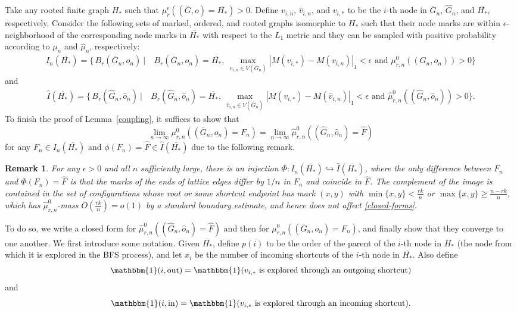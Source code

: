 \documentclass[10pt]{amsart}
\newtheorem{remark}[theorem]{Remark}
\begin{document}
Take any rooted finite graph $H_*$ such that
\(
\mu_r^\epsilon((\overline{G},o)=\overline{H_*})>0.
\)
Define $v_{i,n}$, $\hat v_{i,n}$, and $v_{i,*}$ to be the $i$-th node in
$\overline{G}_n$, $\hat G_n$, and $\overline{H_*}$, respectively. Consider the
following sets of marked, ordered, and rooted graphs isomorphic to $H_*$ such
that their node marks are within $\epsilon$-neighborhood of the corresponding
node marks in $\overline{H_*}$ with respect to the $L_1$ metric and they can be
sampled with positive probability according to $\mu_n$ and $\hat\mu_n$,
respectively:
\begin{align*}
I_n(\overline{H_*})=\Big\{\,B_r(\overline{G}_n,o_n)\ \Big|\ &
B_r(\overline{G}_n,o_n)=\overline{H_*},\
\max_{v_{i,n}\in V(\overline{G}_n)}
|M(v_{i,*})-M(v_{i,n})|_1<\epsilon \text{ and }
\mu_{r,n}^0((G_n,o_n))>0
\Big\}
\end{align*}
and
\begin{align*}
\hat I(\overline{H_*})=\Big\{\,B_r(\hat G_n,\hat o_n)\ \Big|\ &
B_r(\hat G_n,\hat o_n)=\overline{H_*},\
\max_{\hat v_{i,n}\in V(\hat G_n)}
|M(v_{i,*})-M(\hat v_{i,n})|_1<\epsilon \text{ and } \hat\mu_{r,n}^0((\hat G_n,\hat o_n))>0
\Big\}.
\end{align*}
To finish the proof of Lemma~\ref{coupling}, it suffices to show that
\begin{equation}\label{closed-forms}
\lim_{n\to\infty}\mu_{r,n}^0((\overline{G}_n,o_n)=F_n)
=
\lim_{n\to\infty}\hat\mu_{r,n}^0((\hat G_n,\hat o_n)=\hat F)
\end{equation}
for any $F_n\in I_n(\overline{H_*})$ and $\phi(F_n)=\hat F\in\hat I(\overline{H_*})$ due to the following remark.
\begin{remark}\label{dif-lattice-con}
For any $\epsilon>0$ and all $n$ sufficiently large, there is an injection $\Phi: I_n(\overline{H_*}) \hookrightarrow \hat I(\overline{H_*})$, where the only difference between $F_n$ and $\Phi(F_n)=\hat F$ is that the marks of the ends of lattice edges differ by $1/n$ in $F_n$ and coincide in $\hat F$. The complement of the image is contained in the set of configurations whose root or some shortcut endpoint has mark $(x,y)$ with $\min\{x,y\}<\frac{rk}{n}$ or $\max\{x,y\}\ge\frac{n-rk}{n}$, which has $\hat\mu_{r,n}^0$-mass $O\left(\frac{rk}{n}\right)=o(1)$ by a standard boundary estimate, and hence does not affect \eqref{closed-forms}.
\end{remark}
To do so, we write a closed form for
$\hat\mu_{r,n}^0((\hat G_n,\hat o_n)=\hat F)$ and then for
$\mu_{r,n}^0((\overline{G}_n,o_n)=F_n)$, and finally show that they converge to
one another.
We first introduce some notation. Given $\overline{H_*}$, define $p(i)$ to be the order of the parent of the $i$-th node in $H_*$ (the node from which it is explored in the BFS process), and let $x_i$ be the number of incoming shortcuts of the $i$-th node in $\overline{H_*}$. Also define
\[
\mathbbm{1}(i,\mathrm{out})
=
\mathbbm{1}(v_{i,*}\text{ is explored through an outgoing shortcut})
\]
and
\[
\mathbbm{1}(i,\mathrm{in})
=
\mathbbm{1}(v_{i,*}\text{ is explored through an incoming shortcut}).
\]
\end{document}
